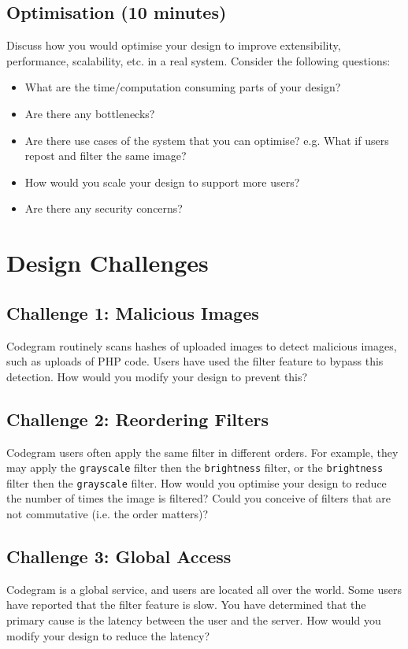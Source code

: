 \documentclass{csse4400}
\begin{document}
\subsection*{Optimisation (10 minutes)}
Discuss how you would optimise your design to improve extensibility, performance, scalability, etc. in a real system.
Consider the following questions:
\begin{itemize}
    \item What are the time/computation consuming parts of your design?
    \item Are there any bottlenecks?
    \item Are there use cases of the system that you can optimise? e.g. What if users repost and filter the same image?
    \item How would you scale your design to support more users?
    \item Are there any security concerns?
\end{itemize}


\section{Design Challenges}

\subsection*{Challenge 1: Malicious Images}
Codegram routinely scans hashes of uploaded images to detect malicious images, such as uploads of PHP code.
Users have used the filter feature to bypass this detection.
How would you modify your design to prevent this?

\subsection*{Challenge 2: Reordering Filters}
Codegram users often apply the same filter in different orders.
For example, they may apply the \texttt{grayscale} filter then the \texttt{brightness} filter,
or the \texttt{brightness} filter then the \texttt{grayscale} filter.
How would you optimise your design to reduce the number of times the image is filtered?
Could you conceive of filters that are not commutative (i.e. the order matters)?

\subsection*{Challenge 3: Global Access}
Codegram is a global service, and users are located all over the world.
Some users have reported that the filter feature is slow.
You have determined that the primary cause is the latency between the user and the server.
How would you modify your design to reduce the latency?
\end{document}
